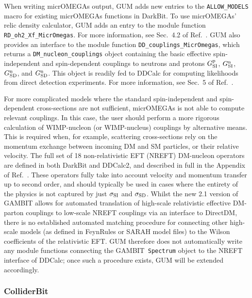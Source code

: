 \documentclass[pdftex,twocolumn,epjc3_preprint,runningheads]{svjour3}
\renewcommand{\_}{\discretionary{\underscore}{}{\underscore}}
\newcommand\cpp[1]{{\lstinline!#1!}}  %
\newcommand{\gambit}{\textsf{GAMBIT}\xspace}
\newcommand{\darkbit}{\textsf{DarkBit}\xspace}
\newcommand{\colliderbit}{\textsf{ColliderBit}\xspace}
\newcommand{\GB}{\gambit}
\newcommand{\mo}{\micromegas}
\newcommand{\micromegas}{\textsf{micrOMEGAs}\xspace}
\newcommand\ddcalc{\textsf{DDCalc}\xspace}
\newcommand{\gum}{\textsf{GUM}\xspace}
\newcommand{\fr}{\textsf{FeynRules}\xspace}
\newcommand{\sarah}{\textsf{SARAH}\xspace}
\newcommand{\ddm}{\textsf{DirectDM}\xspace}
\begin{document}
When writing \mo output, \gum adds new entries to the \cpp{ALLOW_MODELS} macro for existing \mo functions in \darkbit. To use \mo' relic density calculator, \gum adds an entry to the module function \cpp{RD_oh2_Xf_MicrOmegas}. For more information, see Sec.\ 4.2 of Ref.\ \cite{DarkBit}.  \gum also provides an interface to the module function \cpp{DD_couplings_MicrOmegas}, which returns a \cpp{DM_nucleon_couplings} object containing the basic effective spin-independent and spin-dependent couplings to neutrons and protons $G_{\rm SI}^{\rm p}$, $G_{\rm SI}^{\rm n}$, $G_{\rm SD}^{\rm n}$, and $G_{\rm SD}^{\rm n}$. This object is readily fed to \ddcalc for computing likelihoods from direct detection experiments. For more information, see Sec.\ 5 of Ref.\ \cite{DarkBit}.

For more complicated models where the standard spin-independent and spin-dependent cross-sections are not sufficient, \mo is not able to compute relevant couplings. In this case, the user should perform a more rigorous calculation of WIMP-nucleon (or WIMP-nucleus) couplings by alternative means. This is required when, for example, scattering cross-sections rely on the momentum exchange between incoming DM and SM particles, or their relative velocity.  The full set of 18 non-relativistic EFT (NREFT) DM-nucleon operators are defined in both \darkbit and \ddcalc \textsf{2}, and described in full in the Appendix of Ref.~\cite{HP}. These operators fully take into account velocity and momentum transfer up to second order, and should typically be used in cases where the entirety of the physics is not captured by just $\sigma_{\rm{SI}}$ and $\sigma_{\rm{SD}}$.  Whilst the new 2.1 version of \gambit \cite{DMEFT} allows for automated translation of high-scale relativistic effective DM-parton couplings to low-scale NREFT couplings via an interface to \ddm \cite{Bishara:2017nnn,Brod:2017bsw}, there is no established automated matching procedure for connecting other high-scale models (as defined in \fr or \sarah model files) to the Wilson coefficients of the relativistic EFT. \gum therefore does not automatically write any module functions connecting the \GB\ \cpp{Spectrum} object to the NREFT interface of \ddcalc; once such a procedure exists, \gum will be extended accordingly.

\subsubsection{\colliderbit} \label{sec:colliderbit}
\end{document}
